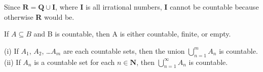             Since $\textbf{R} = \textbf{Q} \cup \textbf{I}$, where \textbf{I} is all irrational numbers, \textbf{I} cannot be countable because otherwise \textbf{R} would be.
            \begin{theorem}
                If $A \subseteq B$ and B is countable, then A is either countable, finite, or empty.
            \end{theorem}
            \begin{theorem}
                (i) If $A_1$, $A_2$, \dots $A_m$ are each countable sets, then the union $\bigcup_{n=1}^{m} A_n$ is countable.
                \newline
                (ii) If $A_n$ is a countable set for each $n \in \textbf{N}$, then $\bigcup_{n=1}^{\infty} A_n$ is countable.
            \end{theorem}